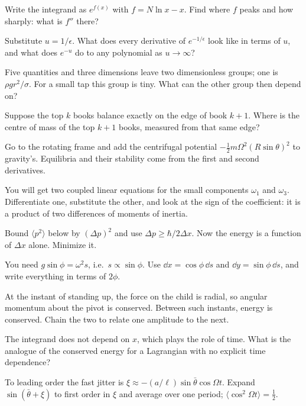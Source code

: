 
 Write the integrand as $e^{f(x)}$ with $f = N\ln x - x$. Find where $f$ peaks and how sharply: what is $f''$ there?

 Substitute $u = 1/\epsilon$. What does every derivative of $e^{-1/\epsilon}$ look like in terms of $u$, and what does $e^{-u}$ do to any polynomial as $u\to\infty$?

 Five quantities and three dimensions leave two dimensionless groups; one is $\rho gr^2/\sigma$. For a small tap this group is tiny. What can the other group then depend on?


 Suppose the top $k$ books balance exactly on the edge of book $k+1$. Where is the centre of mass of the top $k+1$ books, measured from that same edge?

 Go to the rotating frame and add the centrifugal potential $-\tfrac12m\Omega^2(R\sin\theta)^2$ to gravity's. Equilibria and their stability come from the first and second derivatives.

 You will get two coupled linear equations for the small components $\omega_1$ and $\omega_3$. Differentiate one, substitute the other, and look at the sign of the coefficient: it is a product of two differences of moments of inertia.


 Bound $\langle p^2\rangle$ below by $(\Delta p)^2$ and use $\Delta p\ge\hbar/2\Delta x$. Now the energy is a function of $\Delta x$ alone. Minimize it.

 You need $g\sin\phi = \omega^2s$, i.e.\ $s\propto\sin\phi$. Use $\dd x = \cos\phi\,\dd s$ and $\dd y = \sin\phi\,\dd s$, and write everything in terms of $2\phi$.

 At the instant of standing up, the force on the child is radial, so angular momentum about the pivot is conserved. Between such instants, energy is conserved. Chain the two to relate one amplitude to the next.


 The integrand does not depend on $x$, which plays the role of time. What is the analogue of the conserved energy for a Lagrangian with no explicit time dependence?

 To leading order the fast jitter is $\xi\approx-(a/\ell)\sin\bar\theta\cos\Omega t$. Expand $\sin(\bar\theta+\xi)$ to first order in $\xi$ and average over one period; $\langle\cos^2\Omega t\rangle = \tfrac12$.

